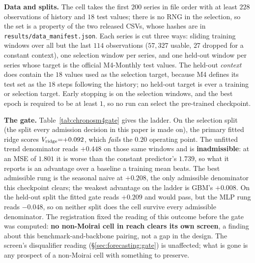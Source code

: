 \textbf{Data and splits.}  The cell takes the first $200$ series in file order
with at least $228$ observations of history and $18$ test values; there is no RNG
in the selection, so the set is a property of the two released CSVs, whose hashes
are in \texttt{results/data\_manifest.json}.  Each series is cut three ways:
sliding training windows over all but the last $114$ observations
($57{,}327$ usable, $27$ dropped for a constant context), one selection window
per series, and one held-out window per series whose target is the official
M4-Monthly test values.  The held-out \emph{context} does contain the $18$ values
used as the selection target, because M4 defines its test set as the $18$ steps
following the history; no held-out target is ever a training or selection target.
Early stopping is on the selection windows, and the best epoch is required to
be at least $1$, so no run can select the pre-trained checkpoint.

\begin{table}[ht]
\centering
\caption{\textbf{The value gate for Chronos/M4-Monthly.}  Ten
denominators against one numerator (median of $20$ Chronos samples, per-window
$z$-scored), on both splits.  A denominator worse than \texttt{constant}, the
training-mean predictor, cannot support a claim that the checkpoint has
something worth preserving: it inflates $\Vb{b}$ in the direction that flatters
the checkpoint, which is the effect that moves $17$ of $21$ Moirai cells
between the unfitted and fitted screens (Appendix~\ref{app:gatecorrection}).}
\label{tab:chronosm4gate}

\end{table}

\textbf{The gate.}
Table~\ref{tab:chronosm4gate} gives the ladder.  On the selection split (the
split every admission decision in this paper is made on), the primary fitted
ridge scores $V_{\text{ridge}}{=}{+}0.092$, which \emph{fails} the $0.20$
operating point.  The unfitted trend denominator reads $+0.448$ on those same
windows and is \textbf{inadmissible}: at an MSE of $1.801$ it is worse than the
constant predictor's $1.739$, so what it reports is an advantage over a baseline
a training mean beats.  The best admissible rung is the seasonal naive at
$+0.208$, the only admissible denominator this checkpoint clears; the weakest
advantage on the ladder is GBM's $+0.008$.  On the held-out split the fitted gate
reads $+0.209$ and would pass, but the MLP rung reads $-0.048$, so on neither
split does the cell survive every admissible denominator.  The registration fixed
the reading of this outcome before the gate was computed: \textbf{no non-Moirai
cell in reach clears its own screen}, a finding about this
benchmark-and-backbone pairing, not a gap in the design.  The screen's
disqualifier reading (\S\ref{sec:forecasting:gate}) is unaffected; what is gone
is any prospect of a non-Moirai cell with something to preserve.

